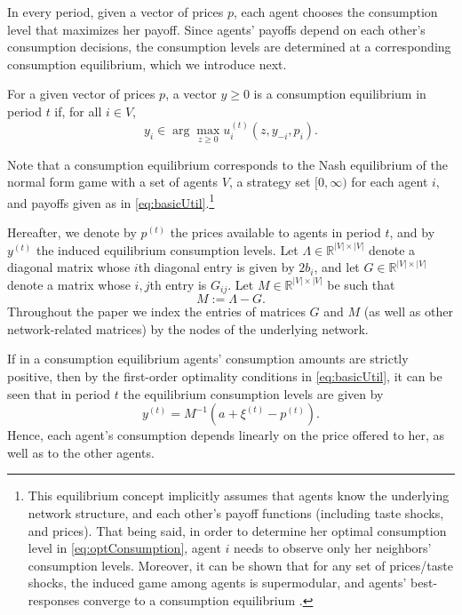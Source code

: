 \documentclass[opre,nonblindrev]{informs3} %
\begin{document}
In every period,
given a vector of prices ${p}$,  each agent chooses the   consumption level that maximizes her payoff.
 Since agents' payoffs depend on each other's consumption decisions,
the consumption levels are determined at a
corresponding consumption equilibrium, which we introduce next.
\begin{definition}
	For a given vector of prices ${p}$, a vector ${y}\geq 0$ is a consumption equilibrium
	in period $t$
	 if, for all $i\in V$,
\begin{equation} \label{eq:optConsumption}
	y_i \in \arg \max_{z\geq 0} u_i^{(t)}(z,y_{-i}, p_i).
\end{equation}
\end{definition}
Note that a consumption equilibrium corresponds to the Nash equilibrium of the normal form game with a set of agents $V$, a strategy set $[0,\infty)$ for each agent $i$, and payoffs given as in \eqref{eq:basicUtil}.\footnote{This equilibrium concept implicitly assumes that agents know the underlying network structure, and each other's payoff functions (including taste shocks, and prices).
	That being said, in order to determine her optimal consumption level in \eqref{eq:optConsumption}, agent $i$ needs to observe only her neighbors' consumption levels.
	Moreover, it can be shown that for any set of prices/taste shocks, the induced game among agents is supermodular, and agents' best-responses converge to a consumption equilibrium  \citep[see, e.g.,][]{candogan2012optimal}.
	}


Hereafter, we denote by ${{p}}^{(t)}$ the prices available to agents in period $t$, and by ${y}^{(t)}$ the induced equilibrium consumption levels.
Let $\Lambda\in \mathbb{R}^{|V| \times |V|}$ denote a diagonal matrix whose $i$th diagonal entry is given by $2b_i$, and let $G\in \mathbb{R}^{|V| \times |V|}$ denote a matrix whose $i,j$th entry is $G_{ij}$. Let $M \in \mathbb{R}^{|V| \times |V|}$ be such that
$$M:=\Lambda-G.$$
	Throughout the paper we index the  entries of matrices $G$ and $M$  (as well as other network-related matrices) by the nodes of the underlying network.

If in a consumption equilibrium agents' consumption amounts are strictly positive, then
by the first-order optimality conditions in \eqref{eq:basicUtil}, it can be seen that in period $t$ the equilibrium consumption levels are given by
\begin{equation} \label{eq:firstOrder}
{y}^{(t)}= M^{-1} ({a} + {\xi}^{(t)} -{p}^{(t)}).
\end{equation}
Hence, each agent's consumption depends linearly on the price offered to her, as well as to the other agents.
\end{document}
